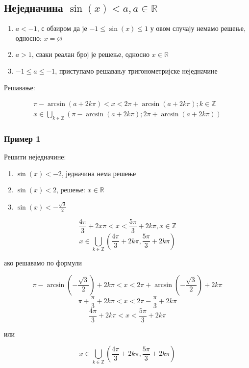 \documentclass[../diplomski.tex]{subfiles}
\begin{document}
\subsection{Неједначина $\sin(x)<a,a\in\mathbb{R}$}

\begin{enumerate}[label=\alph*)]
\item $a<-1$, с обзиром да је $-1\leq\sin(x)\leq1$ у овом случају немамо решење, односно: $x=\varnothing$
\item $a>1$, сваки реалан број је решење, односно $x\in\mathbb{R}$
\item $-1\leq a\leq-1$, приступамо решавању тригонометријске неједначине
\end{enumerate}

Решавање:



\begin{equation}
\begin{split}
\pi-\arcsin(a+2k\pi)<x<2\pi+\arcsin(a+2k\pi);k\in\mathbb{Z}\\
x\in\bigcup\limits_{k\in\mathbb{Z}}(\pi-\arcsin(a+2k\pi);2\pi+\arcsin(a+2k\pi))
\end{split}
\end{equation}


\subsubsection{Пример 1}

Решити неједначине:

\begin{enumerate}[label=\alph*)]
\item $\sin(x)<-2$, једначина нема решење
\item $\sin(x)<2$, решење: $x\in\mathbb{R}$
\item $\sin(x)<-\frac{\sqrt3}{2}$
\end{enumerate}



\[\frac{4\pi}{3}+2x\pi<x<\frac{5\pi}{3}+2k\pi,x\in\mathbb{Z}\]
\[x\in\bigcup_{k\in\mathbb{Z}}(\frac{4\pi}{3}+2k\pi,\frac{5\pi}{3}+2k\pi)\]

ако решавамо по формули

\[\pi-\arcsin\left(-\frac{\sqrt{3}}{2}\right)+2k\pi<x<2\pi+\arcsin\left(-\frac{\sqrt{3}}{2}\right)+2k\pi\]
\[\pi+\frac{\pi}{3}+2k\pi<x<2\pi-\frac{\pi}{3}+2k\pi\]
\[\frac{4\pi}{3}+2k\pi<x<\frac{5\pi}{3}+2k\pi\]
\centerline{или}
\[x\in\bigcup_{k\in\mathbb{Z}}\left(\frac{4\pi}{3}+2k\pi,\frac{5\pi}{3}+2k\pi\right)\]
\end{document}
